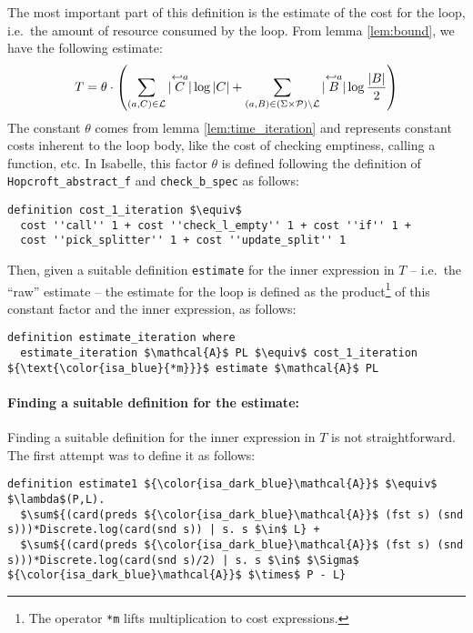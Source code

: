 \documentclass[12pt, a4 paper]{article}
\theoremstyle{definition}
\begin{document}
The most important part of this definition is the estimate of the cost for the loop, i.e.\ the amount of resource consumed by the loop. From lemma \ref{lem:bound}, we have the following estimate:
\begin{equation}\label{eq:estimate}
    T = \theta \cdot \left(\sum_{(a, C) \in \mathcal{L}} | \overset{\hookleftarrow {a}}{C} | \log | C | + \sum_{(a, B) \in (\Sigma\times \mathcal{P})\setminus \mathcal{L}} | \overset{\hookleftarrow {a}}{B} | \log \frac{| B |}{2} \right)
\end{equation}
The constant $\theta$ comes from lemma \ref{lem:time_iteration} and represents constant costs inherent to the loop body, like the cost of checking emptiness, calling a function, etc. In Isabelle, this factor $\theta$ is defined following the definition of \texttt{Hopcroft\_abstract\_f} and \texttt{check\_b\_spec} as follows:

\begin{lstlisting}[language=Isabelle]
definition cost_1_iteration $\equiv$ 
  cost ''call'' 1 + cost ''check_l_empty'' 1 + cost ''if'' 1 +
  cost ''pick_splitter'' 1 + cost ''update_split'' 1
\end{lstlisting}

Then, given a suitable definition \texttt{estimate} for the inner expression in $T$ -- i.e.\ the ``raw'' estimate -- the estimate for the loop is defined as the product\footnote{The operator \texttt{{\color{isa_blue}*m}} lifts multiplication to cost expressions.} of this constant factor and the inner expression, as follows:

\begin{lstlisting}[language=Isabelle]
definition estimate_iteration where
  estimate_iteration $\mathcal{A}$ PL $\equiv$ cost_1_iteration ${\text{\color{isa_blue}{*m}}}$ estimate $\mathcal{A}$ PL
\end{lstlisting}

\paragraph{Finding a suitable definition for the estimate:}
Finding a suitable definition for the inner expression in $T$ is not straightforward. The first attempt was to define it as follows:

\begin{lstlisting}[language=Isabelle]
definition estimate1 ${\color{isa_dark_blue}\mathcal{A}}$ $\equiv$ $\lambda$(P,L).
  $\sum${(card(preds ${\color{isa_dark_blue}\mathcal{A}}$ (fst s) (snd s)))*Discrete.log(card(snd s)) | s. s $\in$ L} +
  $\sum${(card(preds ${\color{isa_dark_blue}\mathcal{A}}$ (fst s) (snd s)))*Discrete.log(card(snd s)/2) | s. s $\in$ $\Sigma$ ${\color{isa_dark_blue}\mathcal{A}}$ $\times$ P - L}
\end{lstlisting}
\end{document}
